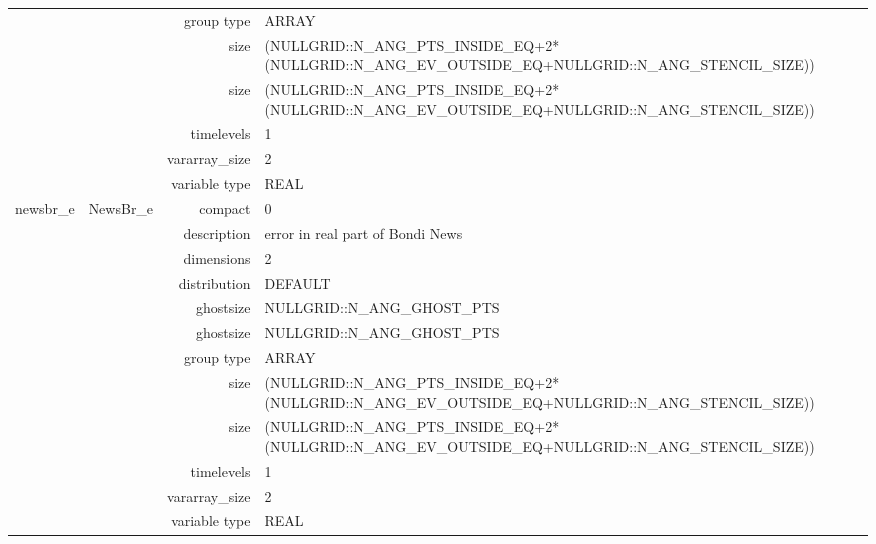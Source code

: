 \begin{tabular*}{150mm}{|c|c@{\extracolsep{\fill}}|rl|}
 &  & group type & ARRAY \\ 
 &  & size & (NULLGRID::N\_ANG\_PTS\_INSIDE\_EQ+2*(NULLGRID::N\_ANG\_EV\_OUTSIDE\_EQ+NULLGRID::N\_ANG\_STENCIL\_SIZE)) \\ 
& ~ & size & (NULLGRID::N\_ANG\_PTS\_INSIDE\_EQ+2*(NULLGRID::N\_ANG\_EV\_OUTSIDE\_EQ+NULLGRID::N\_ANG\_STENCIL\_SIZE)) \\ 
 &  & timelevels & 1 \\ 
 &  & vararray\_size & 2 \\ 
 &  & variable type & REAL \\ 
\hline 
newsbr\_e & NewsBr\_e & compact & 0 \\ 
 &  & description & error in real part of Bondi News \\ 
 &  & dimensions & 2 \\ 
 &  & distribution & DEFAULT \\ 
 &  & ghostsize & NULLGRID::N\_ANG\_GHOST\_PTS \\ 
& ~ & ghostsize & NULLGRID::N\_ANG\_GHOST\_PTS \\ 
 &  & group type & ARRAY \\ 
 &  & size & (NULLGRID::N\_ANG\_PTS\_INSIDE\_EQ+2*(NULLGRID::N\_ANG\_EV\_OUTSIDE\_EQ+NULLGRID::N\_ANG\_STENCIL\_SIZE)) \\ 
& ~ & size & (NULLGRID::N\_ANG\_PTS\_INSIDE\_EQ+2*(NULLGRID::N\_ANG\_EV\_OUTSIDE\_EQ+NULLGRID::N\_ANG\_STENCIL\_SIZE)) \\ 
 &  & timelevels & 1 \\ 
 &  & vararray\_size & 2 \\ 
 &  & variable type & REAL \\ 
\hline 
\end{tabular*} 



\vspace{5mm}
\vspace{5mm}

